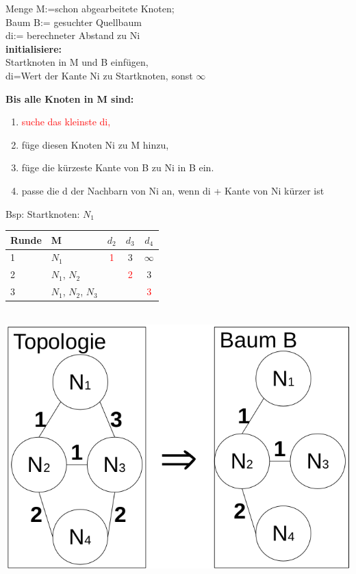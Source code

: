\begin{minipage}[t]{0.25\textwidth}
Menge M:=schon abgearbeitete Knoten; \\
Baum B:= gesuchter Quellbaum \\
di:= berechneter Abstand zu Ni \\
 
\textbf{initialisiere: }\\
Startknoten in M und B einfügen, \\
di=Wert der Kante Ni zu Startknoten, sonst $\infty$

\textbf{Bis alle Knoten in M sind: }
\begin{enumerate}
\item \textcolor{red}{suche das kleinste di, }
\item füge diesen Knoten Ni zu M hinzu, 
\item füge die kürzeste Kante von B zu Ni in B ein.
\item passe die d der Nachbarn von Ni an, wenn di + Kante von Ni kürzer ist
\end{enumerate}

\end{minipage}
\begin{minipage}[t]{0.25\textwidth}
Bsp: Startknoten: $N_1$\\
\begin{tabular}{|l|l|c|c|c|}
\hline
Runde 	&	M 			& $d_2$		& $d_3$			& $d_4$\\	\hline
1	&	{$N_1$} 	& \textcolor{red}{1}	& 3 &	 $\infty$ \\ \hline
2	&	{$N_1$, $N_2$} 	&  		& 	\textcolor{red}{2}	 & 3 \\ \hline
3	&	{$N_1$, $N_2$, $N_3$} 	& 		& 	 & \textcolor{red}{3} \\ \hline
\end{tabular}\\
\includegraphics[width=\textwidth]{Dijkstra}
\end{minipage}\\\\

